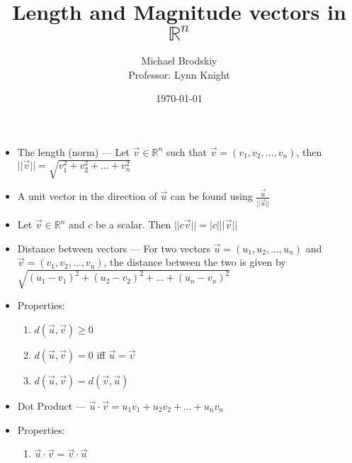 \documentclass[12pt]{article}
\title{Length and Magnitude vectors in $\mathbb{R}^n$}
\date{\today}
\author{Michael Brodskiy\\ \small Professor: Lynn Knight}
\begin{document}
\maketitle

\begin{itemize}

  \item The length (norm) — Let $\overrightarrow{v}\in\mathbb{R}^n$ such that $\overrightarrow{v}=\left( v_1,v_2,\dots,v_n \right)$, then $||\overrightarrow{v}||=\sqrt{v_1^2+v_2^2+\dots+v_n^2}$

  \item A unit vector in the direction of $\overrightarrow{u}$ can be found using $\frac{\overrightarrow{u}}{||\overrightarrow{u}||}$

  \item Let $\overrightarrow{v}\in\mathbb{R}^n$ and $c$ be a scalar. Then $||c\overrightarrow{v}||=|c|||\overrightarrow{v}||$

  \item Distance between vectors — For two vectors $\overrightarrow{u}=\left( u_1,u_2,\dots,u_n \right)$ and $\overrightarrow{v}=\left( v_1,v_2,\dots,v_n \right)$, the distance between the two is given by $\sqrt{(u_1-v_1)^2+(u_2-v_2)^2+\dots+(u_n-v_n)^2}$

  \item Properties:

    \begin{enumerate}

      \item $d(\overrightarrow{u},\overrightarrow{v})\geq0$

      \item $d(\overrightarrow{u},\overrightarrow{v})=0$ iff $\overrightarrow{u}=\overrightarrow{v}$

      \item $d(\overrightarrow{u},\overrightarrow{v})=d(\overrightarrow{v},\overrightarrow{u})$

    \end{enumerate}

  \item Dot Product — $\overrightarrow{u}\cdot\overrightarrow{v}=u_1v_1+u_2v_2+\dots+u_nv_n$

  \item Properties:

    \begin{enumerate}

      \item $\overrightarrow{u}\cdot\overrightarrow{v}=\overrightarrow{v}\cdot\overrightarrow{u}$


\end{enumerate}
\end{itemize}
\end{document}
